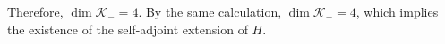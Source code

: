 Therefore, $\dim\mathcal{K}_- = 4$.
By the same calculation, $\dim\mathcal{K}_+ = 4$, which implies the existence of the self-adjoint extension of $H$.

















